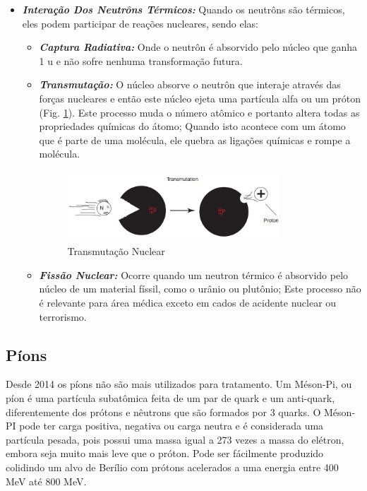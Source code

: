 \documentclass[11pt,a4paper]{article}
\begin{document}
\begin{itemize}
		\item \textbf{\textit{\textcolor{CarnationPink}{Interação Dos Neutrôns Térmicos}:}} Quando os neutrôns são térmicos, eles podem participar de reações nucleares, sendo elas:
		
			\begin{itemize}
				\item \textbf{\textit{\textcolor{CarnationPink}{Captura Radiativa}:}} Onde o neutrôn é absorvido pelo núcleo que ganha 1 u e não sofre nenhuma transformação futura.
				
				\item \textbf{\textit{\textcolor{CarnationPink}{Transmutação}:}} O núcleo absorve o neutrôn que interaje através das forças nucleares e então este núcleo ejeta uma partícula alfa ou um próton (Fig. \ref{fig:transmutacaoNuclear}). Este processo muda o número atômico e portanto altera todas as propriedades químicas do átomo; Quando isto acontece com um átomo que é parte de uma molécula, ele quebra as ligações químicas e rompe a molécula.
				
				\begin{figure}[h]
					\centering
					\includegraphics[width=0.8\textwidth]{Imagens/transmutacaoNuclear.JPG}
					\caption{Transmutação Nuclear}
					\label{fig:transmutacaoNuclear}                
				\end{figure}


				\item \textbf{\textit{\textcolor{CarnationPink}{Fissão Nuclear}:}} Ocorre quando um neutron térmico é absorvido pelo núcleo de um material físsil, como o urânio ou plutônio; Este processo não é relevante para área médica exceto em cados de acidente nuclear ou terrorismo. 
			\end{itemize}
	\end{itemize}

\subsection*{Píons}

    Desde 2014 os píons não são mais utilizados para tratamento. Um Méson-Pi, ou píon é uma partícula subatômica feita de um par de quark e um anti-quark, diferentemente dos prótons e nêutrons que são formados por 3 quarks.  O Méson-PI pode ter carga positiva, negativa ou carga neutra e é considerada uma partícula pesada, pois possui uma massa igual a 273 vezes a massa do elétron, embora seja muito mais leve que o próton. Pode ser fácilmente produzido colidindo um alvo de Berílio com prótons acelerados a uma energia entre 400 MeV até 800 MeV. 
\end{document}
